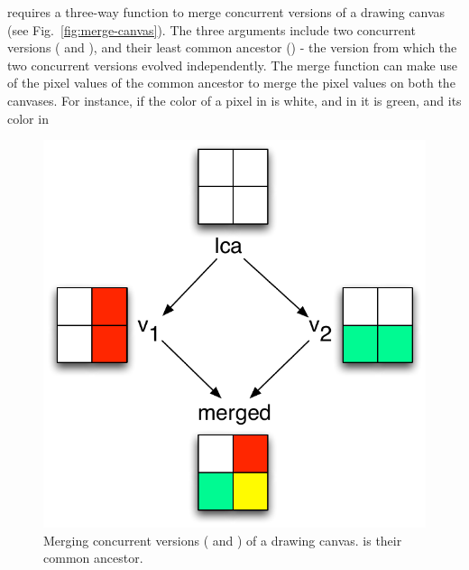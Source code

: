 
\name requires a three-way  function to merge concurrent
versions of a drawing canvas (see Fig.~\ref{fig:merge-canvas}). The
three arguments include two concurrent versions ( and ),
and their least common ancestor () - the version from which the
two concurrent versions evolved independently. The merge function can
make use of the pixel values of the common ancestor to merge the pixel
values on both the canvases. For instance, if the color of a pixel in
 is white, and in  it is green, and its color in 
\begin{figure}
\centering
\includegraphics[scale=0.43]{Figures/canvas-merging}
\caption{Merging concurrent versions ( and ) of a drawing
canvas.  is their common ancestor.}
\label{fig:canvas-merging}
\end{figure}
